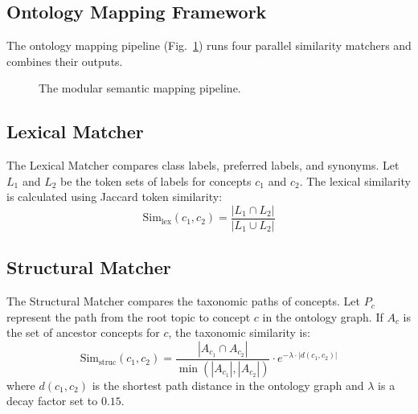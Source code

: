 \documentclass[journal,compsoc]{IEEEtran}
\begin{document}
\begin{itemize}
\section{Ontology Mapping Framework}
The ontology mapping pipeline (Fig.~\ref{fig:mapping}) runs four parallel similarity matchers and combines their outputs.

\begin{figure}[h]
\centering
{}
\caption{The modular semantic mapping pipeline.}
\label{fig:mapping}
\end{figure}

\subsection{Lexical Matcher}
The Lexical Matcher compares class labels, preferred labels, and synonyms. Let $L_1$ and $L_2$ be the token sets of labels for concepts $c_1$ and $c_2$. The lexical similarity is calculated using Jaccard token similarity:
\begin{equation}
\text{Sim}_{\text{lex}}(c_1, c_2) = \frac{|L_1 \cap L_2|}{|L_1 \cup L_2|}
\end{equation}

\subsection{Structural Matcher}
The Structural Matcher compares the taxonomic paths of concepts. Let $P_{c}$ represent the path from the root topic to concept $c$ in the ontology graph. If $A_c$ is the set of ancestor concepts for $c$, the taxonomic similarity is:
\begin{equation}
\text{Sim}_{\text{struc}}(c_1, c_2) = \frac{|A_{c_1} \cap A_{c_2}|}{\min(|A_{c_1}|, |A_{c_2}|)} \cdot e^{-\lambda \cdot |d(c_1, c_2)|}
\end{equation}
where $d(c_1, c_2)$ is the shortest path distance in the ontology graph and $\lambda$ is a decay factor set to $0.15$.


\end{itemize}
\end{document}

